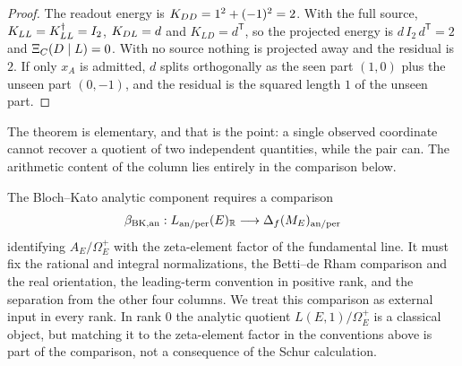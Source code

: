 \begin{proof}
The readout energy is $K_{DD}=1^2+(-1)^2=2$.  With the full source,
$K_{LL}=K_{LL}^{\dagger}=I_2$, $K_{DL}=d$ and $K_{LD}=d^{\mathsf T}$, so the projected
energy is $d\,I_2\,d^{\mathsf T}=2$ and $\Xi_C(D\mid L)=0$.  With no source nothing is
projected away and the residual is $2$.  If only $x_A$ is admitted, $d$
splits orthogonally as the seen part $(1,0)$ plus the unseen part
$(0,-1)$, and the residual is the squared length $1$ of the unseen part.
\end{proof}

The theorem is elementary, and that is the point: a single observed
coordinate cannot recover a quotient of two independent quantities,
while the pair can.  The arithmetic content of the column lies entirely in
the comparison below.

\begin{obligation}\label{obl:apparatus:rho-an-period-transport}
The Bloch--Kato analytic component requires a comparison
\[
  \beta_{\mathrm{BK,an}}:
  L_{\mathrm{an/per}}(E)_{\mathbb{R}}
  \longrightarrow
  \Delta_f(M_E)_{\mathrm{an/per}}
\]
identifying $A_E/\Omega_E^+$ with the zeta-element factor of the
fundamental line.  It must fix the rational and integral normalizations,
the Betti--de Rham comparison and the real orientation, the leading-term
convention in positive rank, and the separation from the other four
columns.  We treat this comparison as external input in every rank.  In
rank $0$ the analytic quotient $L(E,1)/\Omega_E^+$ is a classical object,
but matching it to the zeta-element factor in the conventions above is
part of the comparison, not a consequence of the Schur calculation.
\end{obligation}

